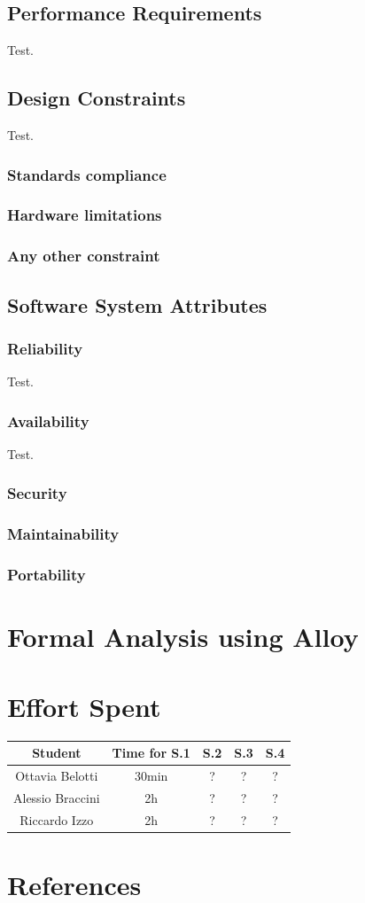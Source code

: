 \documentclass[table, 12pt]{article}
\begin{document}
\subsection{Performance Requirements}
Test.

\subsection{Design Constraints}
Test.

\subsubsection{Standards compliance}
\subsubsection{Hardware limitations}
\subsubsection{Any other constraint}

\subsection{Software System Attributes}
\subsubsection{Reliability}
Test.

\subsubsection{Availability}
Test.

\subsubsection{Security}
\subsubsection{Maintainability}
\subsubsection{Portability}

\section{Formal Analysis using Alloy}
\section{Effort Spent}
    \begin{tabular}{| c || c | c| c| c |}
        \hline
        Student & Time for S.1 & S.2 & S.3 & S.4 \\ \hline
        Ottavia Belotti & 30min & ? & ? & ? \\
        Alessio Braccini & 2h & ? & ? & ? \\
        Riccardo Izzo & 2h & ? & ? & ? \\
        \hline
    \end{tabular}

\section{References}
\end{document}
